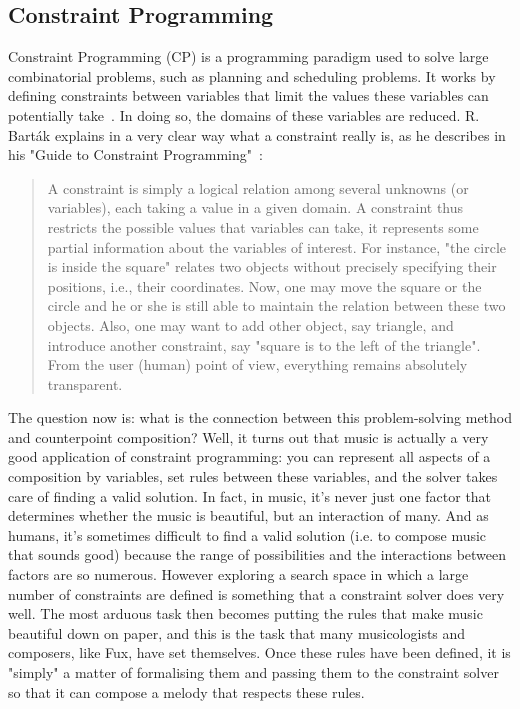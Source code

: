 \subsection{Constraint Programming}
Constraint Programming (CP) is a programming paradigm used to solve large combinatorial problems, such as planning and scheduling problems. It works by defining constraints between variables that limit the values these variables can potentially take~\cite{rossi2008constraint}. In doing so, the domains of these variables are reduced. R. Barták explains in a very clear way what a constraint really is, as he describes in his "Guide to Constraint Programming"~\cite{bartak1998constraint}:

\begin{quote}
    A constraint is simply a logical relation among several unknowns (or variables), each taking a value in a given domain. A constraint thus restricts the possible values that variables can take, it represents some partial information about the variables of interest. For instance, "the circle is inside the square" relates two objects without precisely specifying their positions, i.e., their coordinates. Now, one may move the square or the circle and he or she is still able to maintain the relation between these two objects. Also, one may want to add other object, say triangle, and introduce another constraint, say "square is to the left of the triangle". From the user (human) point of view, everything remains absolutely transparent.
\end{quote}

The question now is: what is the connection between this problem-solving method and counterpoint composition? Well, it turns out that music is actually a very good application of constraint programming: you can represent all aspects of a composition by variables, set rules between these variables, and the solver takes care of finding a valid solution. In fact, in music, it's never just one factor that determines whether the music is beautiful, but an interaction of many. And as humans, it's sometimes difficult to find a valid solution (i.e. to compose music that sounds good) because the range of possibilities and the interactions between factors are so numerous.  However exploring a search space in which a large number of constraints are defined is something that a constraint solver does very well. The most arduous task then becomes putting the rules that make music beautiful down on paper, and this is the task that many musicologists and composers, like Fux, have set themselves. Once these rules have been defined, it is "simply" a matter of formalising them and passing them to the constraint solver so that it can compose a melody that respects these rules.


